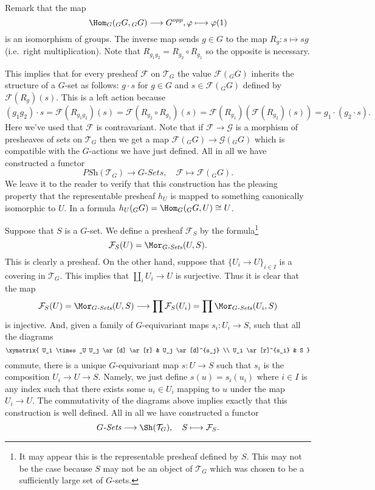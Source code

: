 \medskip\noindent
Remark that the map
$$
\Hom_G({}_GG, {}_GG)
\longrightarrow
G^{opp},
\varphi
\longmapsto
\varphi(1)
$$
is an isomorphism of groups. The inverse map sends $g \in G$
to the map $R_g : s \mapsto sg$ (i.e.\ right multiplication).
Note that $R_{g_1g_2} = R_{g_2} \circ R_{g_1}$ so the opposite
is necessary.

\medskip\noindent
This implies that for every presheaf $\mathcal{F}$ on $\mathcal{T}_G$
the value $\mathcal{F}({}_GG)$ inherits the structure of a $G$-set
as follows: $g \cdot s$ for $g \in G$ and $s \in \mathcal{F}({}_GG)$
defined by $\mathcal{F}(R_g)(s)$. This is a left action
because
$$
(g_1g_2) \cdot s  = \mathcal{F}(R_{g_1g_2})(s) =
\mathcal{F}(R_{g_2}\circ R_{g_1})(s) =
\mathcal{F}(R_{g_1})( \mathcal{F}(R_{g_2})(s)) =
g_1 \cdot (g_2 \cdot s).
$$
Here we've used that $\mathcal{F}$
is contravariant. Note that if $\mathcal{F} \to \mathcal{G}$
is a morphism of presheaves of sets on $\mathcal{T}_G$
then we get a map $\mathcal{F}({}_GG) \to \mathcal{G}({}_GG)$
which is compatible with the $G$-actions we have just defined.
All in all we have constructed a functor
$$
\textit{PSh}(\mathcal{T}_G)
\longrightarrow
G\textit{-Sets}, \quad
\mathcal{F}
\longmapsto
\mathcal{F}({}_GG).
$$
We leave it to the reader to verify that this construction
has the pleasing property that the representable presheaf
$h_U$ is mapped to something canonically isomorphic to $U$.
In a formula $h_U({}_GG) = \Hom_G({}_GG, U) \cong U$.

\medskip\noindent
Suppose that $S$ is a $G$-set. We define a presheaf
$\mathcal{F}_S$ by the formula\footnote{It may appear this is the
representable presheaf defined by $S$. This may not be the case
because $S$ may not be an object of $\mathcal{T}_G$ which was chosen
to be a sufficiently large set of $G$-sets.}
$$
\mathcal{F}_S(U)
=
\Mor_{G\textit{-Sets}}(U, S).
$$
This is clearly a presheaf. On the other hand, suppose that
$\{U_i \to U\}_{i\in I}$ is a covering in $\mathcal{T}_G$.
This implies that $\coprod_i U_i \to U$ is surjective. Thus it is
clear that the map
$$
\mathcal{F}_S(U)
=
\Mor_{G\textit{-Sets}}(U, S)
\longrightarrow
\prod \mathcal{F}_S(U_i)
=
\prod \Mor_{G\textit{-Sets}}(U_i, S)
$$
is injective. And, given a family of $G$-equivariant
maps $s_i : U_i \to S$, such that all the diagrams
$$
\xymatrix{
U_i \times_U U_j \ar[d] \ar[r]
&
U_j \ar[d]^{s_j}
\\
U_i \ar[r]^{s_i}
&
S
}
$$
commute, there is a unique $G$-equivariant map
$s : U \to S$ such that $s_i$ is the composition
$U_i \to U \to S$. Namely, we just define $s(u) = s_i(u_i)$
where $i\in I$ is any index such that there exists some
$u_i \in U_i$ mapping to $u$ under the map $U_i \to U$.
The commutativity of the diagrams above implies exactly
that this construction is well defined. All in all we have
constructed a functor
$$
G\textit{-Sets}
\longrightarrow
\Sh(\mathcal{T}_G), \quad
S
\longmapsto
\mathcal{F}_S
.
$$

